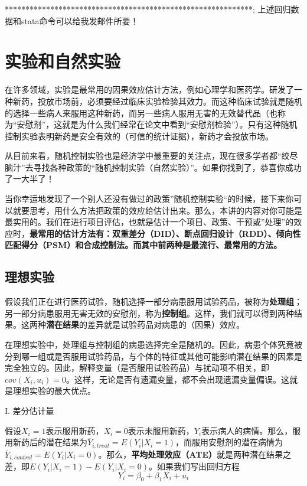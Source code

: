 \documentclass[cn,12pt,math=newtx,citestyle=gb7714-2015,bibstyle=gb7714-2015]{elegantbook}
\begin{document}
	************************************************************;
	上述回归数据和stata命令可以给我发邮件所要！
	
	
	
	
	\chapter{实验和自然实验}
	在许多领域，实验是最常用的因果效应估计方法，例如心理学和医药学。研发了一种新药，投放市场前，必须要经过临床实验检验其效力。而这种临床试验就是随机的选择一些病人来服用这种新药，而另一些病人服用无害的无效替代品（也称为“安慰剂”，这就是为什么我们经常在论文中看到“安慰剂检验”）。只有这种随机控制实验表明新药是安全有效的（可信的统计证据），新药才会投放市场。
	
	从目前来看，随机控制实验也是经济学中最重要的关注点，现在很多学者都“绞尽脑汁”去寻找各种政策的“随机控制实验（自然实验）”。如果你找到了，恭喜你成功了一大半了！
	
	当你幸运地发现了一个别人还没有做过的政策”随机控制实验“的时候，接下来你可以就要思考，用什么方法把政策的效应给估计出来。那么，本讲的内容对你可能是最实用的。我们在进行项目评估，也就是估计一个项目、政策、干预或”处理”的效应时，\textbf{最常用的估计方法有：双重差分（DID）、断点回归设计（RDD）、倾向性匹配得分（PSM）和合成控制法。而其中前两种是最流行、最常用的方法。}
	
	\section{理想实验}
	
	假设我们正在进行医药试验，随机选择一部分病患服用试验药品，被称为\textbf{处理组}；另一部分病患服用无害无效的安慰剂，称为\textbf{控制组}。这样，我们就可以得到两种结果。这两种\textbf{潜在结果}的差异就是试验药品对病患的（因果）效应。
	
	在理想实验中，处理组与控制组的病患选择完全是随机的。因此，病患个体究竟被分到哪一组或是否服用试验药品，与个体的特征或其他可能影响潜在结果的因素是完全独立的。因此，解释变量（是否服用试验药品）与扰动项不相关，即$cov(X_i,u_i)=0$。这样，无论是否有遗漏变量，都不会出现遗漏变量偏误。这就是理想实验的最大优点。
	
	I. 差分估计量
	
	假设$X_i=1$表示服用新药，$X_i=0$表示未服用新药，$Y_i$表示病人的病情。那么，服用新药后的潜在结果为$\overline{Y}_{i,treat}=E(Y_i\big|X_i=1)$，而服用安慰剂的潜在病情为$\overline{Y}_{i,control}=E(Y_i\big|X_i=0)$。那么，\textbf{平均处理效应（ATE）}就是两种潜在结果之差，即$E(Y_i\big|X_i=1)-E(Y_i\big|X_i=0)$。如果我们写出回归方程
	\begin{equation}
		Y_i=\beta_0+\beta_1X_i+u_i
	\end{equation}
	
\end{document}
